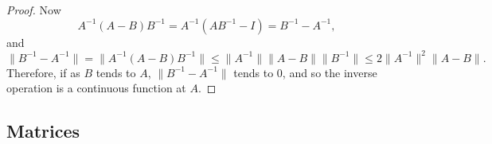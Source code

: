 \documentclass[12pt]{book}
\newcommand{\snorm}[1]{\lVert {#1} \rVert}
\theoremstyle{plain}
\theoremstyle{remark}
\theoremstyle{definition}
\theoremstyle{exercise}
\theoremstyle{example}
\begin{document}
\begin{proof}
Now
\begin{equation*}
A^{-1}(A-B)B^{-1} = 
A^{-1}(AB^{-1}-I) = 
B^{-1}-A^{-1} ,
\end{equation*}
and
\begin{equation*}
\snorm{B^{-1}-A^{-1}} =
\snorm{A^{-1}(A-B)B^{-1}} \leq
\snorm{A^{-1}}\snorm{A-B}\snorm{B^{-1}}
\leq
2\snorm{A^{-1}}^2
\snorm{A-B} .
\end{equation*}
Therefore, if as $B$ tends to $A$, $\snorm{B^{-1}-A^{-1}}$ tends to 0, and
so the inverse operation is a continuous function at $A$.
\end{proof}

\subsection{Matrices}
\end{document}
